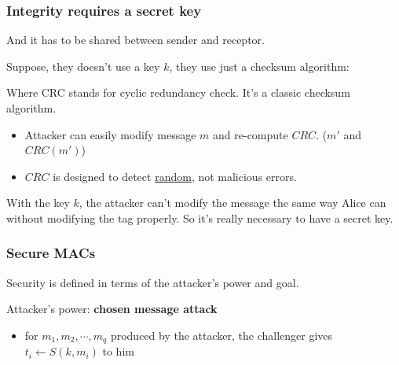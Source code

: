 \documentclass[12pt]{book}
\begin{document}
\subsubsection{Integrity requires a secret key}
And it has to be shared between sender and receptor.

Suppose, they doesn't use a key $k$, they use just a checksum algorithm:
\begin{center}
\end{center}Where CRC stands for cyclic redundancy check. It's a classic checksum algorithm.
\begin{itemize}
	\item Attacker can easily modify message $m$ and re-compute $CRC$. ($m'$ and $CRC(m')$)
	\item $CRC$ is designed to detect \underline{random}, not malicious errors.
\end{itemize}

With the key $k$, the attacker can't modify the message the same way Alice can without modifying the tag properly. So it's really necessary to have a secret key.

\subsubsection{Secure MACs}
Security is defined in terms of the attacker's power and goal.

Attacker's power: \textbf{chosen message attack}
\begin{itemize}
	\item for $m_{1},m_{2},\cdots,m_{q}$ produced by the attacker, the challenger gives  $t_{i}\leftarrow S(k,m_{i})$ to him
\end{itemize}
\end{document}
